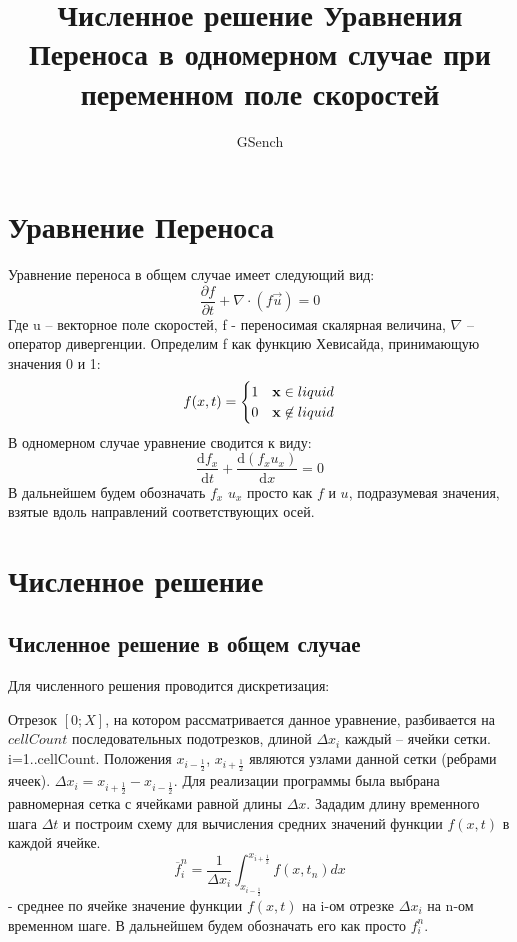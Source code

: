 \documentclass[10pt,a4paper]{article}
\author{GSench}
\title{Численное решение Уравнения Переноса в одномерном случае при переменном поле скоростей}
\begin{document}
\section{Уравнение Переноса}
Уравнение переноса в общем случае имеет следующий вид:
\begin{equation}
\frac{\partial f}{\partial t}+\nabla\cdot(f\overrightarrow{u})=0
\end{equation}
Где u – векторное поле скоростей, f - переносимая скалярная величина, $ \nabla $ – оператор дивергенции. Определим f как функцию Хевисайда, принимающую значения 0 и 1:
\begin{equation}
f(x,t)=\begin{cases}1 & {\bf x}\in liquid \\0 & {\bf x}\not\in liquid\end{cases}
\end{equation}
В одномерном случае уравнение сводится к виду:
\begin{equation}
\label{eqn:TE1D}
\frac{\text{d}f_{x}}{\text{d}t} + \frac{\text{d}(f_{x}u_{x})}{\text{d}x}=0
\end{equation}
В дальнейшем будем обозначать $f_x$ $u_x$ просто как $f$ и $u$, подразумевая значения, взятые вдоль направлений соответствующих осей.

\section{Численное решение}
\subsection{Численное решение в общем случае}
Для численного решения проводится дискретизация:

Отрезок $[0;X]$, на котором рассматривается данное уравнение, разбивается на $cellCount$ последовательных подотрезков, длиной $\Delta x_i$ каждый – ячейки сетки. i=1..cellCount. Положения $x_{i-\frac{1}{2}}$, $x_{i+\frac{1}{2}}$ являются узлами данной сетки (ребрами ячеек). $\Delta x_i=x_{i+\frac{1}{2}}-x_{i-\frac{1}{2}}$. Для реализации программы была выбрана равномерная сетка с ячейками равной длины $\Delta x$. Зададим длину временного шага $\Delta t$ и построим схему для вычисления средних значений функции $f(x,t)$ в каждой ячейке.
\begin{equation}
\overline{f}_i^n=\frac{1}{\Delta x_i}\int_{x_{i-\frac{1}{2}}}^{x_{i+\frac{1}{2}}}f(x,t_n)dx 
\end{equation}
- среднее по ячейке значение функции $f(x,t)$ на i-ом отрезке $\Delta x_i$ на n-ом временном шаге. В дальнейшем будем обозначать его как просто $f_i^n$.
\end{document}
